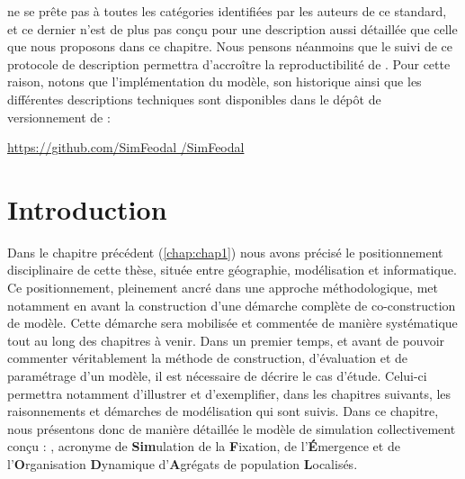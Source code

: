 \begin{mdframed}[backgroundcolor=black!5,footnoteinside=false]
\simfeodal{} ne se prête pas à toutes les catégories identifiées par les auteurs de ce standard, et ce dernier n'est de plus pas conçu pour une description aussi détaillée que celle que nous proposons dans ce chapitre.
Nous pensons néanmoins que le suivi de ce protocole de description permettra d'accroître la reproductibilité de \simfeodal{}.
Pour cette raison, notons que l'implémentation du modèle, son historique ainsi que les différentes descriptions techniques sont disponibles dans le dépôt de versionnement de \simfeodal{} :
\begin{center}
	\href{https://github.com/SimFeodal/SimFeodal}{https://github.com/SimFeodal /SimFeodal}
\end{center}

\end{mdframed}

\clearpage

\clearpage


\section*{Introduction}
\label{sec:chap2-intro}

Dans le chapitre précédent (\cref{chap:chap1}) nous avons précisé le positionnement disciplinaire de cette thèse, située entre géographie, modélisation et informatique.
Ce positionnement, pleinement ancré dans une approche méthodologique, met notamment en avant la construction d'une démarche complète de co-construction de modèle.
Cette démarche sera mobilisée et commentée de manière systématique tout au long des chapitres à venir.
Dans un premier temps, et avant de pouvoir commenter véritablement la méthode de construction, d'évaluation et de paramétrage d'un modèle, il est nécessaire de décrire le cas d'étude.
Celui-ci permettra notamment d'illustrer et d'exemplifier, dans les chapitres suivants, les raisonnements et démarches de modélisation qui sont suivis.
Dans ce chapitre, nous présentons donc de manière détaillée le modèle de simulation collectivement conçu : \simfeodal{}, acronyme de \og \textbf{Sim}ulation de la \textbf{F}ixation, de l'\textbf{É}mergence et de l'\textbf{O}rganisation \textbf{D}ynamique d'\textbf{A}grégats de population \textbf{L}ocalisés\fg{}.

